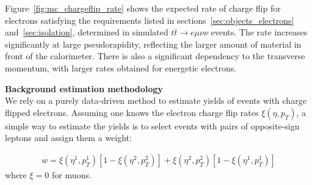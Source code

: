 Figure~\ref{fig:mc_chargeflip_rate} shows the expected rate of charge flip for electrons 
satisfying the requirements listed in sections~\ref{sec:objects_electrons} and~\ref{sec:isolation}, 
determined in simulated $t\bar{t}\to e\mu\nu\nu$ events. 
The rate increases significantly at large pseudorapidity, reflecting the larger amount of material in front of the calorimeter. 
There is also a significant dependency to the transverse momentum, with larger rates obtained for energetic electrons. 
\\
\par{\bf Background estimation methodology\\}
We rely on a purely data-driven method to estimate yields of events with charge flipped electrons. 
Assuming one knows the electron charge flip rates $\xi(\eta,p_T)$, a simple way to estimate the yields is to select 
events with pairs of opposite-sign leptons and assign them a weight: 

\begin{align}
w = \xi\left(\eta^{1},p_T^{1}\right)\left[1-\xi\left(\eta^{2},p_T^{2}\right)\right] 
+ \xi\left(\eta^{2},p_T^{2}\right)\left[1-\xi\left(\eta^{1},p_T^{1}\right)\right] 
\end{align}
where $\xi=0$ for muons. 

